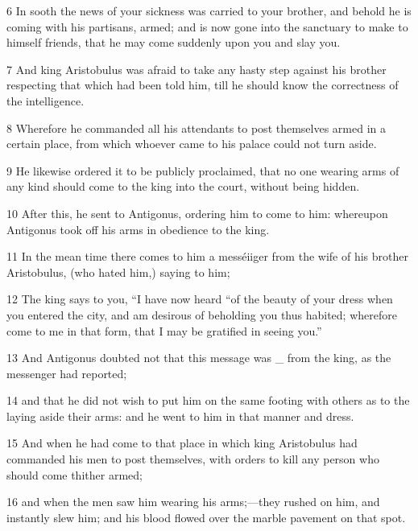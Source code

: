 \par 6 In sooth the news of your sickness was carried to your brother, and behold he is coming with his partisans, armed; and is now gone into the sanctuary to make to himself friends, that he may come suddenly upon you and slay you. 

\par 7 And king Aristobulus was afraid to take any hasty step against his brother respecting that which had been told him, till he should know the correctness of the intelligence. 

\par 8 Wherefore he commanded all his attendants to post themselves armed in a certain place, from which whoever came to his palace could not turn aside. 

\par 9 He likewise ordered it to be publicly proclaimed, that no one wearing arms of any kind should come to the king into the court, without being hidden. 

\par 10 After this, he sent to Antigonus, ordering him to come to him: whereupon Antigonus took off his arms in obedience to the king. 

\par 11 In the mean time there comes to him a messéiiger from the wife of his brother Aristobulus, (who hated him,) saying to him; 

\par 12 The king says to you, “I have now heard “of the beauty of your dress when you entered the city, and am desirous of beholding you thus habited; wherefore come to me in that form, that I may be gratified in seeing you.” 

\par 13 And Antigonus doubted not that this message was _ from the king, as the messenger had reported; 

\par 14 and that he did not wish to put him on the same footing with others as to the laying aside their arms: and he went to him in that manner and dress. 

\par 15 And when he had come to that place in which king Aristobulus had commanded his men to post themselves, with orders to kill any person who should come thither armed; 

\par 16 and when the men saw him wearing his arms;—they rushed on him, and instantly slew him; and his blood flowed over the marble pavement on that spot. 

